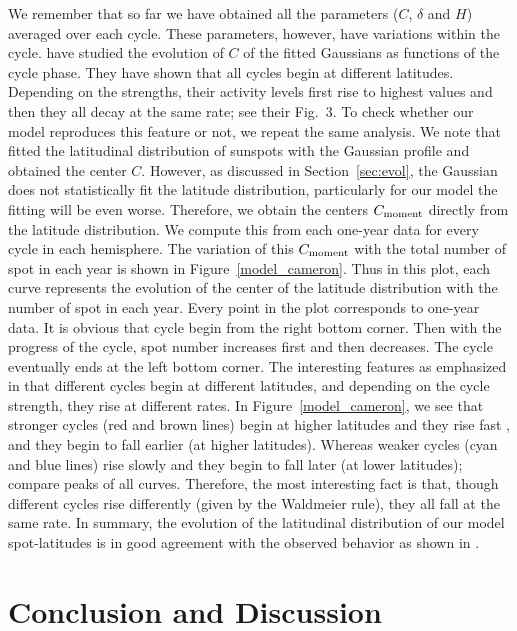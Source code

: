 \documentclass[preprint2,times,tighten]{aastex61}
\newcommand{\Fig}[1]{Figure~\ref{#1}}
\newcommand{\Sec}[1]{Section~\ref{#1}}
\begin{document}
We remember that so far we have obtained all the parameters ($C$, $\delta$ and $H$) averaged over each cycle. These parameters, however, have variations within the cycle.
\citet{CS16} have studied the evolution of $C$ of the fitted Gaussians as functions of the cycle phase. 
They have shown that all cycles begin at different latitudes. Depending on the strengths, their activity levels first rise to highest values 
and then they all decay at the same rate; see their Fig.\ 3. 
To check whether our model reproduces this feature or not, we repeat the same analysis. 
We note that \citet{CS16} fitted the latitudinal distribution of sunspots with the Gaussian profile and obtained the center $C$. 
However, as discussed in \Sec{sec:evol}, the Gaussian does not statistically fit the latitude distribution, particularly for our model the fitting will be even worse. Therefore, 
we obtain the centers $C_{\rm{ moment}}$ directly from the latitude  distribution. 
We compute this from each one-year data for every cycle in each hemisphere.  
The variation of this $C_{\rm{ moment}}$ with the total number of spot in each year is shown 
in \Fig{model_cameron}. Thus in this plot, each curve represents the evolution of the center of the latitude distribution with the number of spot in each year. 
Every point in the plot corresponds to one-year data. It is obvious that cycle begin from the right bottom corner. Then with the progress of the cycle, spot number increases first and then decreases. The cycle eventually ends at the left bottom corner. The interesting features as emphasized in \citet{CS16} that different cycles begin at different latitudes, and depending on the cycle strength, they rise at different rates. In \Fig{model_cameron}, we see that stronger cycles (red and brown lines) begin at higher latitudes and they rise fast \citep[the Waldmeier effect---][]{Wald,KC11}, and they begin to fall earlier (at higher latitudes). Whereas weaker cycles (cyan and blue lines) rise slowly and they begin to fall later (at lower latitudes); compare peaks of all curves. Therefore, the most interesting fact is that, though different cycles rise differently (given by the Waldmeier rule), they all fall at the same rate.  
In summary, the evolution of the latitudinal distribution of our model spot-latitudes is in good agreement with the observed behavior as shown in \cite{CS16}.

\section{Conclusion and Discussion}\label{sec:summary}
\end{document}
